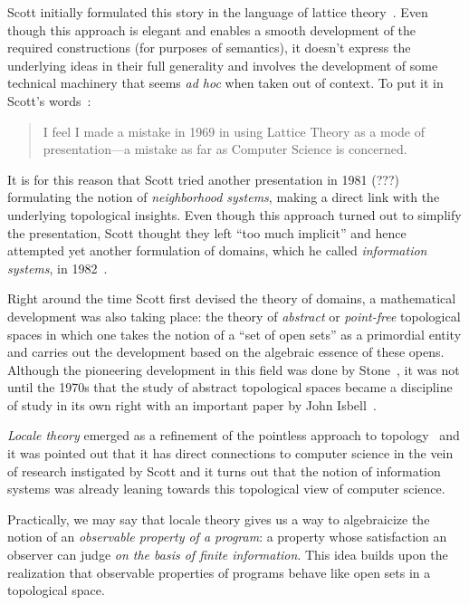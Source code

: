 \documentclass{article}
\begin{document}
Scott initially formulated this story in the language of lattice
theory~\cite{birkhoff:1940}. Even though this approach is elegant and enables a smooth
development of the required constructions (for purposes of semantics), it doesn't express
the underlying ideas in their full generality and involves the development of some
technical machinery that seems \emph{ad hoc} when taken out of context. To put it in
Scott's words~\cite[pg.~577]{scott:1982}:

\begin{quote}
  I feel I made a mistake in 1969 in using Lattice Theory as a mode of
  presentation---a mistake as far as Computer Science is concerned.
\end{quote}

It is for this reason that Scott tried another presentation in 1981 (???) formulating the
notion of \emph{neighborhood systems}, making a direct link with the underlying
topological insights. Even though this approach turned out to simplify the presentation,
Scott thought they left ``too much implicit'' and hence attempted yet another formulation
of domains, which he called \emph{information systems}, in 1982~\cite{scott:1982}.

Right around the time Scott first devised the theory of domains, a mathematical
development was also taking place: the theory of \emph{abstract} or \emph{point-free}
topological spaces in which one takes the notion of a ``set of open sets'' as a primordial
entity and carries out the development based on the algebraic essence of these opens.
Although the pioneering development in this field was done by Stone~\cite{stone:1934}, it
was not until the 1970s that the study of abstract topological spaces became a discipline
of study in its own right with an important paper by John Isbell~\cite{isbell:1973}.

\emph{Locale theory} emerged as a refinement of the pointless approach to topology~\cite{
johnstone:1982} and it was pointed out that it has direct connections to computer
science in the vein of research instigated by Scott and it turns out that the notion of
information systems was already leaning towards this topological view of computer science.

Practically, we may say that locale theory gives us a way to algebraicize the notion of an
\emph{observable property of a program}: a property whose satisfaction an observer can
judge \emph{on the basis of finite information}. This idea builds upon the realization
that observable properties of programs behave like open sets in a topological space.
\end{document}
